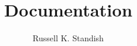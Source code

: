 \batchmode
{}

\let\providecommand\newcommand
\RequirePackage{ifthen}


\title{{\sffamily\slshape
    \mbox{\raisebox{.5ex}{Eco}}}{} Documentation}
\author{Russell K. Standish}%
\providecommand{\br}{\mbox{${\bf r}$}}  %
\providecommand{\bbeta}{\mbox{\boldmath{$\beta$}}}    %
\providecommand{\bgamma}{\mbox{\boldmath{$\gamma$}}}  %
\providecommand{\bmu}{\mbox{\boldmath{$\mu$}}}        %
\providecommand{\bn}{\mbox{\boldmath{$n$}}}           %
\providecommand{\nsp}{\mbox{$n_{\rm sp}$}}            %

%
\providecommand{\EcoLab}{{\sffamily\slshape
    \mbox{\raisebox{.5ex}{Eco}\hspace{-.4em}{\makebox[.5em]{L}ab}}}} 

%
\providecommand{\psection}[1]{\subsection{#1}}%
\providecommand{\psubsection}[1]{\subsubsection{#1}} 


\makeindex








\usepackage[latin1]{inputenc}



\makeatletter

